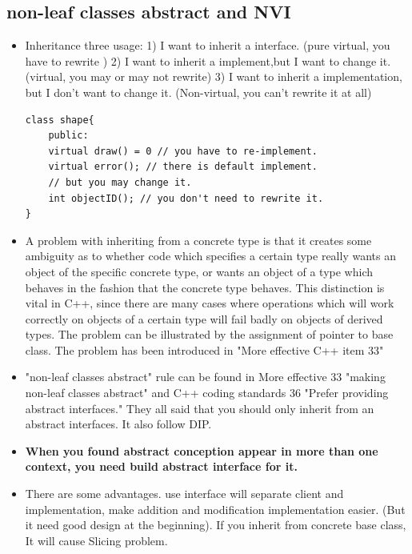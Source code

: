 \documentclass[a4paper,11pt,twoside]{book}
\begin{document}
\subsection{non-leaf classes abstract and NVI}

\begin{itemize}

\item Inheritance three usage: 1) I want to inherit a interface. (pure virtual, you have to rewrite ) 2) I want to inherit a implement,but I want to change it. (virtual, you may or may not rewrite) 3) I want to inherit a implementation, but I don't want to change it. (Non-virtual, you can't rewrite it at all)
\begin{lstlisting}[numbers=none]
class shape{
	public:
	virtual draw() = 0 // you have to re-implement.
	virtual error(); // there is default implement.
	// but you may change it.
	int objectID(); // you don't need to rewrite it.
}	
\end{lstlisting}

	\item A problem with inheriting from a concrete type is that it creates some ambiguity as to whether code which specifies a certain type really wants an object of the specific concrete type, or wants an object of a type which behaves in the fashion that the concrete type behaves. This distinction is vital in C++, since there are many cases where operations which will work correctly on objects of a certain type will fail badly on objects of derived types. The problem can be illustrated by the assignment of pointer to base class. The problem has been introduced in "More effective C++ item 33"
	

	\item "non-leaf classes abstract" rule can be found in More effective 33 "making non-leaf classes abstract" and C++ coding standards 36 "Prefer providing abstract interfaces." They all said that you should only inherit from an abstract interfaces. It also follow DIP.

	\item \textbf{When you found abstract conception appear in more than one context, you need build abstract interface for it. }

	\item There are some advantages. use interface will separate client and implementation, make addition and modification implementation easier. (But it need good design at the beginning). If you inherit from concrete base class, It will cause Slicing problem. 


\end{itemize}
\end{document}
